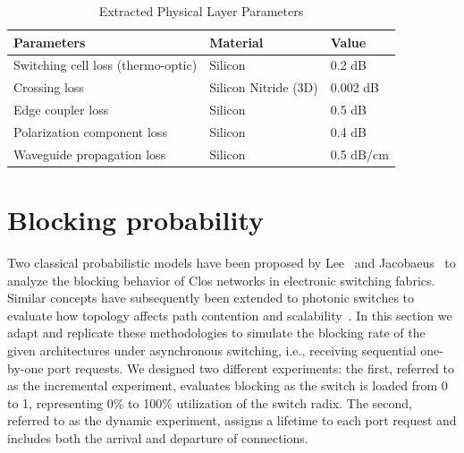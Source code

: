 \begin{table}[htbp]
    \renewcommand{\arraystretch}{1.3}
    \caption{Extracted Physical Layer Parameters\label{tab:ch4-sota-bb}}
    \centering
    \small
    \begin{tabular}{lll}
        \hline
        \textbf{Parameters}                & {Material}           & \textbf{Value}                                                                                   \\
        \hline
        Switching cell loss (thermo-optic) & Silicon              & 0.2 dB \cite{suzukiLargescaleSiliconPhotonics2025a, papadovasilakisCompactBroadbandLowloss2023a} \\
        Crossing loss                      & Silicon Nitride (3D) & 0.002 dB \cite{sacherMonolithicallyIntegratedMultilayer2018}                                     \\
        Edge coupler loss                  & Silicon              & 0.5 dB \cite{muEdgeCouplersSilicon2020}                                                          \\
        Polarization component loss        & Silicon              & 0.4 dB \cite{leeExperimentalDemonstrationAdiabatic2024}                                          \\
        Waveguide propagation loss         & Silicon              & 0.5 dB/cm \cite{luLowlossHighuniformitySilicon2025}                                              \\
        \hline
    \end{tabular}
\end{table}

\section{Blocking probability}\label{sec:blocking_probability} %
Two classical probabilistic models have been proposed by Lee~\cite{leeblocking} and Jacobaeus~\cite{lutton1983blocking} to analyze the blocking behavior of Clos networks in electronic switching fabrics.
Similar concepts have subsequently been extended to photonic switches to evaluate how topology affects path contention and scalability~\cite{fukushimaRoutingAlgorithmsPacket2008a,xiaohongjiangPerformanceModelingAlloptical2005}.
In this section we adapt and replicate these methodologies to simulate the blocking rate of the given architectures under asynchronous switching, i.e., receiving sequential one-by-one port requests.
We designed two different experiments: the first, referred to as the incremental experiment, evaluates blocking as the switch is loaded from 0 to 1, representing 0\% to 100\% utilization of the switch radix.
The second, referred to as the dynamic experiment, assigns a lifetime to each port request and includes both the arrival and departure of connections.

